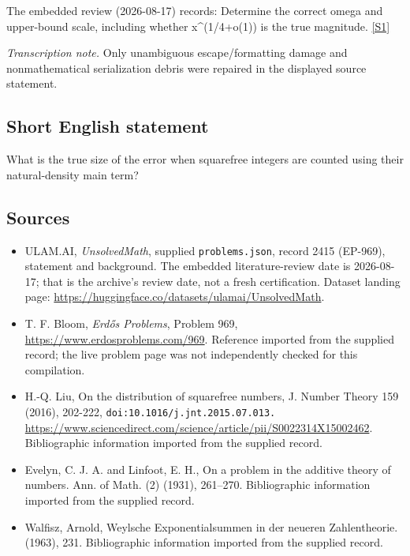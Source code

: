 \documentclass[11pt,a4paper]{article}
\newcommand{\sref}[2]{\hyperlink{source:#1:#2}{[S#2]}}
\begin{document}
The embedded review (2026-08-17) records: Determine the correct omega and upper-bound scale, including whether x\textasciicircum{}(1/4+o(1)) is the true magnitude. \sref{2415}{1}

{\small\emph{Transcription note.} Only unambiguous escape/formatting damage and nonmathematical serialization debris were repaired in the displayed source statement.}

\subsection{Short English statement}

What is the true size of the error when squarefree integers are counted using their natural-density main term?

\subsection{Sources}

{\small

\begin{itemize}

\item[\hypertarget{source:2415:1}{S1}] ULAM.AI, \emph{UnsolvedMath}, supplied \texttt{problems.json}, record 2415 (EP-969), statement and background. The embedded literature-review date is 2026-08-17; that is the archive’s review date, not a fresh certification. Dataset landing page: \url{https://huggingface.co/datasets/ulamai/UnsolvedMath}.

\item[\hypertarget{source:2415:2}{S2}] T. F. Bloom, \emph{Erdős Problems}, Problem 969, \url{https://www.erdosproblems.com/969}. Reference imported from the supplied record; the live problem page was not independently checked for this compilation.

\item[\hypertarget{source:2415:3}{S3}] H.-Q. Liu, On the distribution of squarefree numbers, J. Number Theory 159 (2016), 202-222, \nolinkurl{doi:10.1016/j.jnt.2015.07.013.} \url{https://www.sciencedirect.com/science/article/pii/S0022314X15002462}. Bibliographic information imported from the supplied record.

\item[\hypertarget{source:2415:4}{S4}] Evelyn, C. J. A. and Linfoot, E. H., On a problem in the additive theory of numbers. Ann. of Math. (2) (1931), 261--270. Bibliographic information imported from the supplied record.

\item[\hypertarget{source:2415:5}{S5}] Walfisz, Arnold, Weylsche {E}xponentialsummen in der neueren {Z}ahlentheorie. (1963), 231. Bibliographic information imported from the supplied record.

\end{itemize}

}

\label{end:2415}
\end{document}
